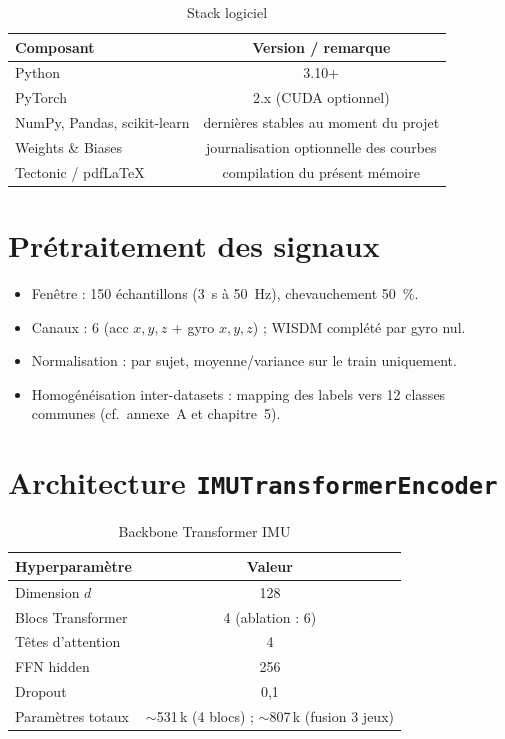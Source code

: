 \documentclass[a4paper,12pt]{report}
\begin{document}
\begin{table}[H]
\centering
\small
\begin{tabularx}{\textwidth}{|Y|c|}
\hline
\textbf{Composant} & \textbf{Version / remarque} \\
\hline
Python & 3.10+ \\
PyTorch & 2.x (CUDA optionnel) \\
NumPy, Pandas, scikit-learn & dernières stables au moment du projet \\
Weights \& Biases & journalisation optionnelle des courbes \\
Tectonic / pdfLaTeX & compilation du présent mémoire \\
\hline
\end{tabularx}
\caption{Stack logiciel}
\label{tab:app_software}
\end{table}

\section{Prétraitement des signaux}

\begin{itemize}
  \item Fenêtre : 150 échantillons (3~s à 50~Hz), chevauchement 50~\%.
  \item Canaux : 6 (acc $x,y,z$ + gyro $x,y,z$) ; WISDM complété par gyro nul.
  \item Normalisation : par sujet, moyenne/variance sur le train uniquement.
  \item Homogénéisation inter-datasets : mapping des labels vers 12 classes communes
  (cf.\ annexe~A et chapitre~5).
\end{itemize}

\section{Architecture \texttt{IMUTransformerEncoder}}

\begin{table}[H]
\centering
\small
\begin{tabularx}{0.92\textwidth}{|Y|c|}
\hline
\textbf{Hyperparamètre} & \textbf{Valeur} \\
\hline
Dimension $d$ & 128 \\
Blocs Transformer & 4 (ablation : 6) \\
Têtes d'attention & 4 \\
FFN hidden & 256 \\
Dropout & 0,1 \\
Paramètres totaux & $\sim$531\,k (4 blocs) ; $\sim$807\,k (fusion 3 jeux) \\
\hline
\end{tabularx}
\caption{Backbone Transformer IMU}
\label{tab:app_backbone}
\end{table}
\end{document}
